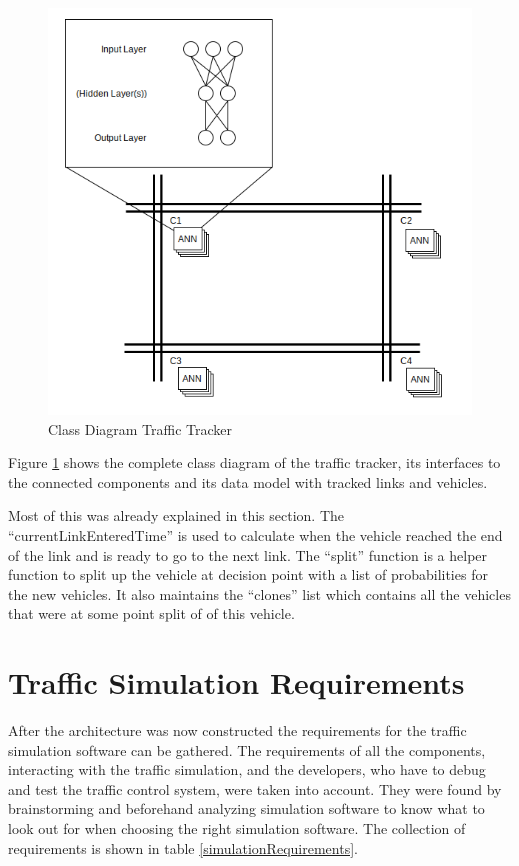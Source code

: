 \begin{figure}[!ht]
  \centering
  \includegraphics[width=14cm]{figures/predictionNetworkAlt2}
  \caption[Class Diagram Traffic Tracker]{Class Diagram Traffic Tracker \protect\footnotemark}
  \label{trafficTracker}
\end{figure}

Figure \ref{trafficTracker} shows the complete class diagram of the traffic tracker, its interfaces to the connected components and its data model with tracked links and vehicles.

Most of this was already explained in this section. The ``currentLinkEnteredTime'' is used to calculate when the vehicle reached the end of the link and is ready to go to the next link. The ``split'' function is a helper function to split up the vehicle at decision point with a list of probabilities for the new vehicles. It also maintains the ``clones'' list which contains all the vehicles that were at some point split of of this vehicle.

\section{Traffic Simulation Requirements}
\label{trafficSimulationRequirements}

After the architecture was now constructed the requirements for the traffic simulation software can be gathered. The requirements of all the components, interacting with the traffic simulation, and the developers, who have to debug and test the traffic control system, were taken into account. They were found by brainstorming and beforehand analyzing simulation software to know what to look out for when choosing the right simulation software. The collection of requirements is shown in table \ref{simulationRequirements}.

